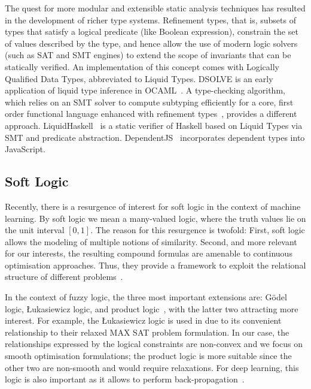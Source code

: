 \documentclass[acmsmall, review, anonymous]{acmart}\settopmatter{printfolios=true,printccs=false,printacmref=false}
\begin{document}
The quest for more modular and extensible static analysis techniques has
resulted in the development of richer type systems.
Refinement types, that is, subsets of types that satisfy a logical predicate (like Boolean expression),
constrain the set of values described by the type, and hence allow the use of
modern logic solvers (such as SAT and SMT engines) to extend the
scope of invariants that can be statically verified.
An implementation of this concept comes with Logically Qualified Data Types,
abbreviated to Liquid Types.
DSOLVE is an early application of liquid type inference in OCAML~\citep{liquid}.
A type-checking algorithm, which relies on an SMT solver
to compute subtyping efficiently for a core, first order functional language
enhanced with refinement types~\citep{semanticSMT}, provides a different
approach.
LiquidHaskell~\citep{refHaskell} is a static verifier of
Haskell based on Liquid Types via SMT and predicate
abstraction.
DependentJS~\citep{dependentJS} incorporates dependent types into JavaScript.

% 
\subsection{Soft Logic}\label{ssec:softlogic}
Recently, there is a resurgence of interest for soft logic in the context of machine learning. By soft logic we mean a many-valued logic, where the truth values lie on the unit interval $[0,1]$. The 
reason for this resurgence is twofold: First,
soft logic allows the modeling of multiple notions
of similarity. Second, and more relevant for our
interests, the resulting compound formulas are 
amenable to continuous optimisation approaches. Thus, they provide a framework to exploit the relational structure of different problems~\cite{kimmig12}. 

In the context of fuzzy logic, the three most
important extensions are: G{\"o}del logic, {\L}ukasiewicz logic, and product logic~\cite{hajek98}, with the latter two attracting more interest. For example, the {\L}ukasiewicz logic is used in \citet{bach17} due 
to its convenient relationship to their relaxed MAX 
SAT problem formulation. In our case, the relationships expressed by the logical constraints are non-convex and we focus on smooth optimisation
formulations; the product logic is more
suitable since the other two are non-smooth and 
would require relaxations. For 
deep learning, this logic is also important as it 
allows to perform back-propagation~\cite{evans18}.
\end{document}
